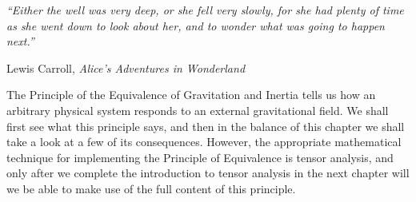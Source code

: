
\begin{flushright}
\begin{minipage}{0.44\textwidth}
\itshape
``Either the well was very deep, or she fell very slowly, for she had plenty
of time as she went down to look about her, and to wonder what was going to
happen next.''\par
\raggedleft Lewis Carroll, \emph{Alice's Adventures in Wonderland}
\end{minipage}
\end{flushright}

The Principle of the Equivalence of Gravitation and Inertia tells us how an
arbitrary physical system responds to an external gravitational field. We
shall first see what this principle says, and then in the balance of this
chapter we shall take a look at a few of its consequences. However, the
appropriate mathematical technique for implementing the Principle of
Equivalence is tensor analysis, and only after we complete the introduction
to tensor analysis in the next chapter will we be able to make use of the
full content of this principle.
